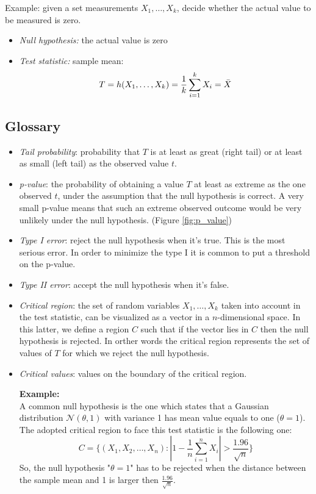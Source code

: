 Example: given a set measurements $X_1, \hdots, X_k$, decide whether the actual value to be measured is zero.
\begin{itemize}
    \item \textit{Null hypothesis:} the actual value is zero
    \item \textit{Test statistic:} sample mean:
    $$T = h(X_1, \hdots , X_k) = \frac{1}{k} \sum_{i=1}^k X_i = \Bar{X}$$
\end{itemize}

\subsection{Glossary}
\begin{itemize}
    \item \textit{Tail probability}: probability that $T$ is at least as great (right tail) or at least as small (left tail) as the observed value $t$.
    
    \item \textit{p-value}: the probability of obtaining a value $T$ at least as extreme as the one observed $t$, under the assumption that the null hypothesis is correct. A very small p-value means that such an extreme observed outcome would be very unlikely under the null hypothesis. (Figure \ref{fig:p_value})
    
    \item \textit{Type I error}: reject the null hypothesis when it's true. This is the most serious error. In order to minimize the type I it is common to put a threshold on the p-value.
    
    \item \textit{Type II error}: accept the null hypothesis when it's false.
    
    \item \textit{Critical region}: the set of random variables $X_1, \hdots, X_k$ taken into account in the test statistic, can be visualized as a vector in a $n$-dimensional space. In this latter, we define a region $C$ such that if the vector lies in $C$ then the null hypothesis is rejected. In orther words the critical region represents the set of values of $T$ for which we reject the null hypothesis.
    
    \item \textit{Critical values}: values on the boundary of the critical region. \newline
    
    \textbf{Example:}\\
    A common null hypothesis is the one which states that a Gaussian distribution $\mathcal{N}(\theta, 1)$ with variance 1 has mean value equals to one ($\theta = 1$). The adopted critical region to face this test statistic is the following one:
    $$C = \{(X_1, X_2, \hdots, X_n) : |1 - \frac{1}{n} \sum_{i=1}^n X_i| > \frac{1.96}{\sqrt{n}}\}$$
    So, the null hypothesis "$\theta = 1$" has to be rejected when the distance between the sample mean and 1 is larger then $\frac{1.96}{\sqrt{n}}$.
    

\end{itemize}

